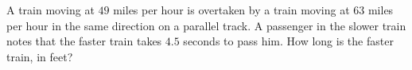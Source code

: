 A train moving at $49$ miles per hour is overtaken by a train moving at $63$ miles per hour in the same direction on a parallel track. A passenger in the slower train notes that the faster train takes $4.5$ seconds to pass him. How long is the faster train, in feet?
